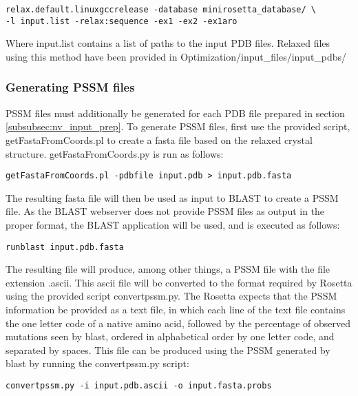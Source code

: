 \singlespace
\begin{Verbatim}
relax.default.linuxgccrelease -database minirosetta_database/ \
-l input.list -relax:sequence -ex1 -ex2 -ex1aro
\end{Verbatim}
\doublespace

Where input.list contains a list of paths to the input PDB files.
Relaxed files using this method have been provided in Optimization/input\_files/input\_pdbs/

\subsubsection{Generating PSSM files}
PSSM files must additionally be generated for each PDB file prepared in section \ref{subsubsec:nv_input_prep}.
To generate PSSM files, first use the provided script, getFastaFromCoords.pl to create a fasta file based on the relaxed crystal structure.
getFastaFromCoords.py is run as follows:

\singlespace
\begin{Verbatim}
getFastaFromCoords.pl -pdbfile input.pdb > input.pdb.fasta
\end{Verbatim}
\doublespace

The resulting fasta file will then be used as input to BLAST to create a PSSM file.
As the BLAST webserver does not provide PSSM files as output in the proper format, the BLAST application will be used, and is executed as follows:

\singlespace
\begin{Verbatim}
runblast input.pdb.fasta
\end{Verbatim}
\doublespace

The resulting file will produce, among other things, a PSSM file with the file extension .ascii.
This ascii file will be converted to the format required by Rosetta using the provided script convertpssm.py.
The Rosetta expects that the PSSM information be provided as a text file, in which each line of the text file contains the one letter code of a native amino acid, followed by the percentage of observed mutations seen by blast, ordered in alphabetical order by one letter code, and separated by spaces.
This file can be produced using the PSSM generated by blast by running the convertpssm.py script:

\singlespace
\begin{Verbatim}
convertpssm.py -i input.pdb.ascii -o input.fasta.probs
\end{Verbatim}
\doublespace

